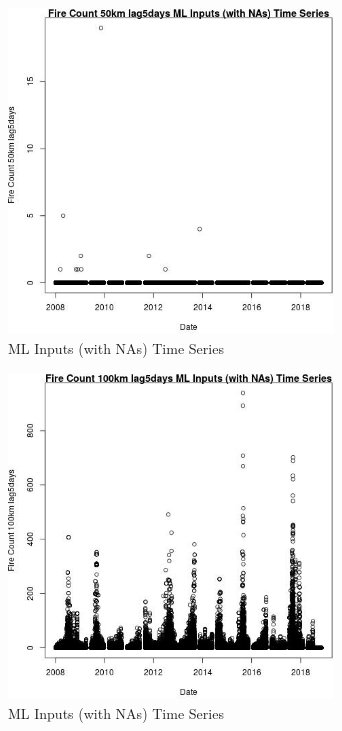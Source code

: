 \begin{figure} 
\centering  
\includegraphics[width=0.77\textwidth]{Code_Outputs/Report_ML_input_PM25_Step4_part_e_de_duplicated_aves_compiled_2019-05-20wNAs_Fire_Count_50km_lag5daysvDate.jpg} 
\caption{\label{fig:Report_ML_input_PM25_Step4_part_e_de_duplicated_aves_compiled_2019-05-20wNAsFire_Count_50km_lag5daysvDate}ML Inputs (with NAs) Time Series} 
\end{figure} 
 

\clearpage 

\begin{figure} 
\centering  
\includegraphics[width=0.77\textwidth]{Code_Outputs/Report_ML_input_PM25_Step4_part_e_de_duplicated_aves_compiled_2019-05-20wNAs_Fire_Count_100km_lag5daysvDate.jpg} 
\caption{\label{fig:Report_ML_input_PM25_Step4_part_e_de_duplicated_aves_compiled_2019-05-20wNAsFire_Count_100km_lag5daysvDate}ML Inputs (with NAs) Time Series} 
\end{figure} 
 

